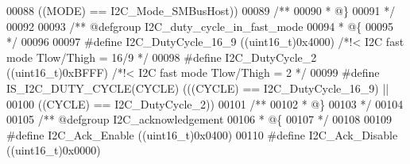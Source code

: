 \begin{DoxyCode}
00088                            \textcolor{preprocessor}{(}\textcolor{preprocessor}{(}\textcolor{preprocessor}{MODE}\textcolor{preprocessor}{)} \textcolor{preprocessor}{==} I2C_Mode_SMBusHost\textcolor{preprocessor}{)}\textcolor{preprocessor}{)}
00089 \textcolor{comment}{/**}
00090 \textcolor{comment}{  * @\}}
00091 \textcolor{comment}{  */}
00092 
00093 \textcolor{comment}{/** @defgroup I2C\_duty\_cycle\_in\_fast\_mode }
00094 \textcolor{comment}{  * @\{}
00095 \textcolor{comment}{  */}
00096 
00097 \textcolor{preprocessor}{#}\textcolor{preprocessor}{define} \textcolor{preprocessor}{I2C\_DutyCycle\_16\_9}              \textcolor{preprocessor}{(}\textcolor{preprocessor}{(}\textcolor{preprocessor}{uint16\_t}\textcolor{preprocessor}{)}0x4000\textcolor{preprocessor}{)} \textcolor{comment}{/*!< I2C fast mode Tlow/Thigh = 16/9 */}
00098 \textcolor{preprocessor}{#}\textcolor{preprocessor}{define} \textcolor{preprocessor}{I2C\_DutyCycle\_2}                 \textcolor{preprocessor}{(}\textcolor{preprocessor}{(}\textcolor{preprocessor}{uint16\_t}\textcolor{preprocessor}{)}0xBFFF\textcolor{preprocessor}{)} \textcolor{comment}{/*!< I2C fast mode Tlow/Thigh = 2 */}
00099 \textcolor{preprocessor}{#}\textcolor{preprocessor}{define} \textcolor{preprocessor}{IS\_I2C\_DUTY\_CYCLE}\textcolor{preprocessor}{(}\textcolor{preprocessor}{CYCLE}\textcolor{preprocessor}{)} \textcolor{preprocessor}{(}\textcolor{preprocessor}{(}\textcolor{preprocessor}{(}\textcolor{preprocessor}{CYCLE}\textcolor{preprocessor}{)} \textcolor{preprocessor}{==} I2C_DutyCycle_16_9\textcolor{preprocessor}{)} \textcolor{preprocessor}{||}
00100                                   \textcolor{preprocessor}{(}\textcolor{preprocessor}{(}\textcolor{preprocessor}{CYCLE}\textcolor{preprocessor}{)} \textcolor{preprocessor}{==} I2C_DutyCycle_2\textcolor{preprocessor}{)}\textcolor{preprocessor}{)}
00101 \textcolor{comment}{/**}
00102 \textcolor{comment}{  * @\}}
00103 \textcolor{comment}{  */}
00104 
00105 \textcolor{comment}{/** @defgroup I2C\_acknowledgement}
00106 \textcolor{comment}{  * @\{}
00107 \textcolor{comment}{  */}
00108 
00109 \textcolor{preprocessor}{#}\textcolor{preprocessor}{define} \textcolor{preprocessor}{I2C\_Ack\_Enable}                  \textcolor{preprocessor}{(}\textcolor{preprocessor}{(}\textcolor{preprocessor}{uint16\_t}\textcolor{preprocessor}{)}0x0400\textcolor{preprocessor}{)}
00110 \textcolor{preprocessor}{#}\textcolor{preprocessor}{define} \textcolor{preprocessor}{I2C\_Ack\_Disable}                 \textcolor{preprocessor}{(}\textcolor{preprocessor}{(}\textcolor{preprocessor}{uint16\_t}\textcolor{preprocessor}{)}0x0000\textcolor{preprocessor}{)}

\end{DoxyCode}
